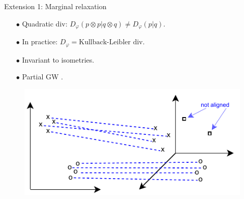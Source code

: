 \documentclass{beamer}
\begin{document}
\begin{frame}{Extension 1: Marginal relaxation}
  \begin{minipage}[t]{0.6\linewidth}
  \begin{itemize}
    \item[$\bullet$] Quadratic div: $D_{\varphi}(p \otimes p | q \otimes q) \neq D_{\varphi}(p | q)$.
    \item[$\bullet$] In practice: $D_{\varphi} = \text{Kullback-Leibler div}$.
    \item[$\bullet$] Invariant to isometries.
    \item[$\bullet$] Partial GW \parencite{Chapel20}.
  \end{itemize}
  \end{minipage}%
  \hfill%
  \hspace{-6cm}
  \begin{minipage}[t]{0.45\linewidth}
    \vspace{0.2cm}
  \begin{figure}
    \centering
    \includegraphics[width=1.15\linewidth, keepaspectratio=true]{OT_new/ugw.pdf}
  \end{figure}
  \end{minipage}

\end{frame}
\end{document}

